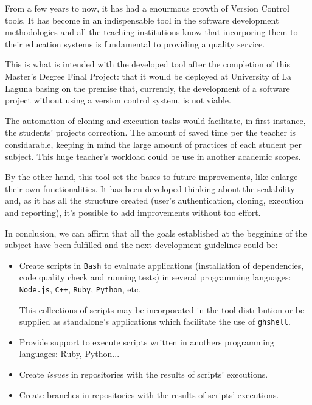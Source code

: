 

From a few years to now, it has had a enourmous growth of Version Control tools. It has become in an indispensable tool in the software development methodologies and all the teaching institutions know that incorporing them to their education systems is fundamental to providing a quality service.
\bigskip

This is what is intended with the developed tool after the completion of this Master's Degree Final Project: that it would be deployed at University of La Laguna basing on the premise that, currently, the development of a software project without using a version control system, is not viable. 
\bigskip

The automation of cloning and execution tasks would facilitate, in first instance, the students' projects correction. The amount of saved time per the teacher is considarable, keeping in mind the large amount of practices of each student per subject. This huge teacher's workload could be use in another academic scopes.
\bigskip

By the other hand, this tool set the bases to future improvements, like enlarge their own functionalities. It has been developed thinking about the scalability and, as it has all the structure created (user's authentication, cloning, execution and reporting), it's possible to add improvements without too effort.
\newpage

In conclusion, we can affirm that all the goals established at the beggining of the subject have been fulfilled and the next development guidelines could be:


\begin{itemize}
	\item Create scripts in \verb|Bash| to evaluate applications (installation of dependencies, code quality check and running tests) in several programming languages: \verb|Node.js|, \verb|C++|, \verb|Ruby|, \verb|Python|, etc.
	\bigskip
	
	This collections of scripts may be incorporated in the tool distribution or be supplied as standalone's applications which facilitate the use of \verb|ghshell|.
	
	\item Provide support to execute scripts written in anothers programming languages: Ruby, Python...
	\item Create {\it issues} in repositories with the results of scripts' executions.
	\item Create branches in repositories with the results of scripts' executions.
\end{itemize}
